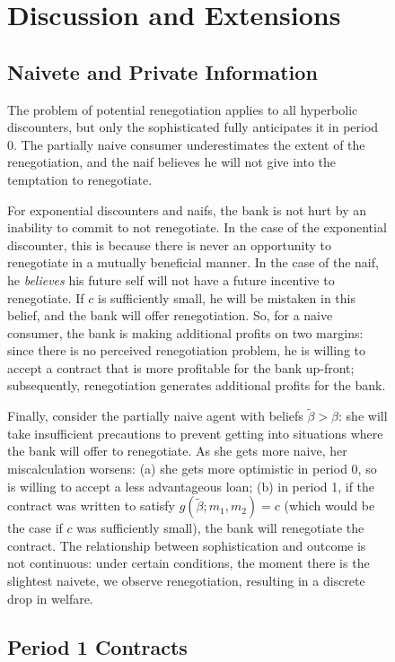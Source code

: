 \documentclass[11pt]{article}%
\begin{document}
\begin{figure}
{\section{Discussion and Extensions}

\subsection{Naivete and Private Information}

The problem of potential renegotiation applies to all hyperbolic discounters,
but only the sophisticated fully anticipates it in period 0. The partially
naive consumer underestimates the extent of the renegotiation, and the naif
believes he will not give into the temptation to renegotiate.

For exponential discounters and naifs, the bank is not hurt by an inability to
commit to not renegotiate. In the case of the exponential discounter, this is
because there is never an opportunity to renegotiate in a mutually beneficial
manner. In the case of the naif, he \textit{believes} his future self will not
have a future incentive to renegotiate. If $c$ is sufficiently small, he will
be mistaken in this belief, and the bank will offer renegotiation. So, for a
naive consumer, the bank is making additional profits on two margins: since
there is no perceived renegotiation problem, he is willing to accept a
contract that is more profitable for the bank up-front; subsequently,
renegotiation generates additional profits for the bank.

Finally, consider the partially naive agent with beliefs $\tilde{\beta}>\beta
$: she will take insufficient precautions to prevent getting into situations
where the bank will offer to renegotiate. As she gets more naive, her
miscalculation worsens: (a) she gets more optimistic in period 0, so is
willing to accept a less advantageous loan; (b) in period 1, if the contract
was written to satisfy $g\left(  \tilde{\beta};m_{1},m_{2}\right)  =c$ (which
would be the case if $c$ was sufficiently small), the bank will renegotiate
the contract. The relationship between sophistication and outcome is not
continuous: under certain conditions, the moment there is the slightest
naivete, we observe renegotiation, resulting in a discrete drop in welfare.

\subsection{Period 1 Contracts}

}
\end{figure}
\end{document}
